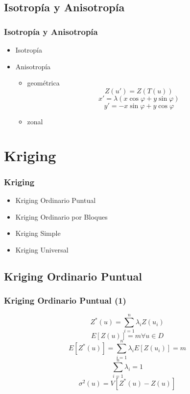 \documentclass{beamer}
\begin{document}
\subsection{Isotropía y Anisotropía}
\begin{frame}
\frametitle{Isotropía y Anisotropía}
\begin{itemize}
\item Isotropía
\item Anisotropía
\begin{itemize}
\item geométrica
\begin{equation}
Z(u') = Z(T(u))
\end{equation}
\begin{equation}
x'=\lambda(x \cos \varphi + y \sin \varphi)
\end{equation}
\begin{equation}
y'= -x \sin \varphi + y \cos \varphi
\end{equation}
\item zonal

\end{itemize}
\end{itemize}
\end{frame}



\section{Kriging}
\begin{frame}
\frametitle{Kriging}
\begin{itemize}
\item Kriging Ordinario Puntual
\item Kriging Ordinario por Bloques
\item Kriging Simple
\item Kriging Universal
\end{itemize}
\end{frame}


\subsection{Kriging Ordinario Puntual}
\begin{frame}
\frametitle{Kriging Ordinario Puntual (1)}
\begin{equation}
Z^*(u) = \sum_{i=1}^n \lambda_i Z(u_i)
\end{equation}
\begin{equation}
E[Z(u)] = m \forall u \in D
\end{equation}
\begin{equation}
E[Z^*(u)] = \sum_{i=1}^n \lambda_i E[Z(u_i)] = m
\end{equation}
\begin{equation}
\sum_{i=1}^n \lambda_i = 1
\end{equation}
\begin{equation}
\sigma^2(u) = V[Z^*(u)-Z(u)]
\end{equation}
\end{frame}
\end{document}
